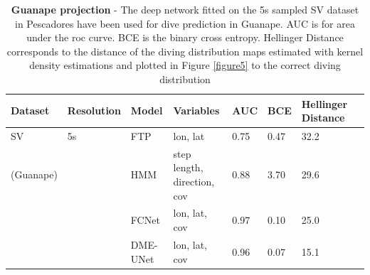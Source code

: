 \documentclass{article}
\begin{document}
\begin{table}[h]
 \caption{\textbf{Guanape projection} - The deep network fitted on the 5s sampled SV dataset in Pescadores have been used for dive prediction in Guanape. AUC is for area under the roc curve. BCE is the binary cross entropy. Hellinger Distance corresponds to the distance of the diving distribution maps estimated with kernel density estimations and plotted in Figure \ref{figure5} to the correct diving distribution}
  \centering
  \begin{tabular}{llllllll}
    \toprule
    Dataset  &  Resolution &  Model & Variables & AUC & BCE & Hellinger Distance \\
    \midrule
    SV      & 5s  & FTP    & lon, lat               & 0.75 & 0.47 & 32.2          \\
  (Guanape) &     & HMM    & step length, direction, cov & 0.88 & 3.70 & 29.6     \\
            &     & FCNet  & lon, lat, cov  & 0.97 & 0.10 & 25.0                  \\
            &     & DME-UNet   & lon, lat, cov  & 0.96 & 0.07 & 15.1              \\
    \bottomrule
  \end{tabular}
  \label{table3}
\end{table}
\end{document}

